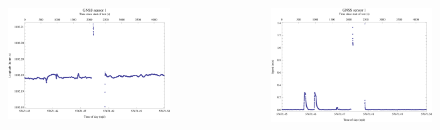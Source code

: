 \documentclass[xcolor=table]{beamer}
\begin{document}
\begin{frame}
\begin{columns}
      \begin{figure}
        \includegraphics[scale=0.40]{thesis/graphics/gnssLong1-1.png}
      \end{figure}
            \vspace{-30pt}
      \begin{figure}
        \includegraphics[scale=0.40]{thesis/graphics/gnssSpeed1-1.png}
      \end{figure}

    \end{columns}  
\end{frame}
\end{document}
